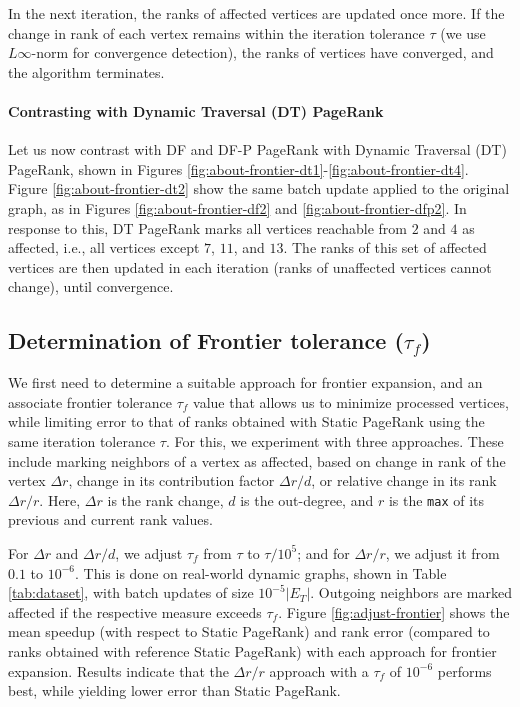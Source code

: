 In the next iteration, the ranks of affected vertices are updated once more. If the change in rank of each vertex remains within the iteration tolerance $\tau$ (we use $L\infty$-norm for convergence detection), the ranks of vertices have converged, and the algorithm terminates.

\paragraph{Contrasting with Dynamic Traversal (DT) PageRank}

Let us now contrast with DF and DF-P PageRank with Dynamic Traversal (DT) PageRank, shown in Figures \ref{fig:about-frontier-dt1}-\ref{fig:about-frontier-dt4}. Figure \ref{fig:about-frontier-dt2} show the same batch update applied to the original graph, as in Figures \ref{fig:about-frontier-df2} and \ref{fig:about-frontier-dfp2}. In response to this, DT PageRank marks all vertices reachable from $2$ and $4$ as affected, i.e., all vertices except $7$, $11$, and $13$. The ranks of this set of affected vertices are then updated in each iteration (ranks of unaffected vertices cannot change), until convergence.


\subsection{Determination of Frontier tolerance ($\tau_f$)}
\label{sec:frontier-tolerance}

We first need to determine a suitable approach for frontier expansion, and an associate frontier tolerance $\tau_f$ value that allows us to minimize processed vertices, while limiting error to that of ranks obtained with Static PageRank using the same iteration tolerance $\tau$. For this, we experiment with three approaches. These include marking neighbors of a vertex as affected, based on change in rank of the vertex $\Delta r$, change in its contribution factor $\Delta r/d$, or relative change in its rank $\Delta r/r$. Here, $\Delta r$ is the rank change, $d$ is the out-degree, and $r$ is the \texttt{max} of its previous and current rank values.

For $\Delta r$ and $\Delta r/d$, we adjust $\tau_f$ from $\tau$ to $\tau/10^5$; and for $\Delta r/r$, we adjust it from $0.1$ to $10^{-6}$. This is done on real-world dynamic graphs, shown in Table \ref{tab:dataset}, with batch updates of size $10^{-5}|E_T|$. Outgoing neighbors are marked affected if the respective measure exceeds $\tau_f$. Figure \ref{fig:adjust-frontier} shows the mean speedup (with respect to Static PageRank) and rank error (compared to ranks obtained with reference Static PageRank) with each approach for frontier expansion. Results indicate that the $\Delta r/r$ approach with a $\tau_f$ of $10^{-6}$ performs best, while yielding lower error than Static PageRank.

